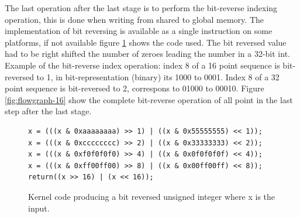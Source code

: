 The last operation after the last stage is to perform the bit-reverse indexing operation, this is done when writing from shared to global memory. The implementation of bit reversing is available as a single instruction on some platforms, if not available figure \ref{fig:code-bit-reverse} shows the code used. The bit reversed value had to be right shifted the number of zeroes leading the number in a 32-bit int. Example of the bit-reverse index operation: index 8 of a 16 point sequence is bit-reversed to 1, in bit-representation (binary) its 1000 to 0001. Index 8 of a 32 point sequence is bit-reversed to 2, correspons to 01000 to 00010. Figure \ref{fig:flowgraph-16} show the complete bit-reverse operation of all point in the last step after the last stage.

\begin{figure}[h]
	\centering
	\lstset{language=C++}
	\begin{framed}
	\begin{lstlisting}
x = (((x & 0xaaaaaaaa) >> 1) | ((x & 0x55555555) << 1));
x = (((x & 0xcccccccc) >> 2) | ((x & 0x33333333) << 2));
x = (((x & 0xf0f0f0f0) >> 4) | ((x & 0x0f0f0f0f) << 4));
x = (((x & 0xff00ff00) >> 8) | ((x & 0x00ff00ff) << 8));
return((x >> 16) | (x << 16));
	\end{lstlisting}
	\end{framed}
	\caption{ Kernel code producing a bit reversed unsigned integer where x is the input. }
	\label{fig:code-bit-reverse}
\end{figure}

